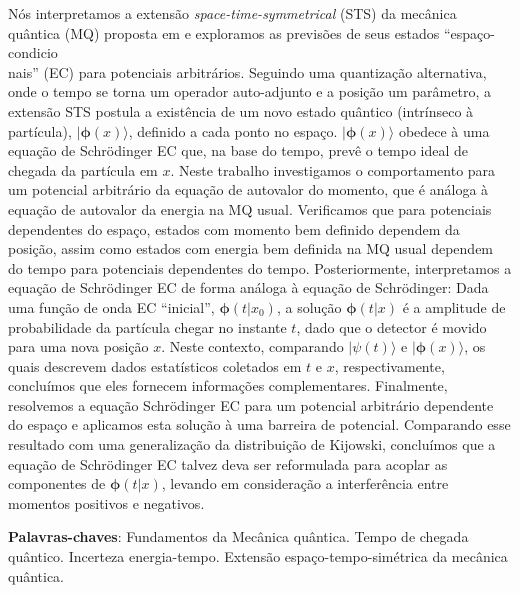 
\begin{resumo}[Resumo] 
Nós interpretamos a extensão \textit{space-time-symmetrical} (STS) da mecânica quântica (MQ) proposta em \cite{Dias} e exploramos as previsões de seus estados ``espaço-condicio\\nais'' (EC) para potenciais arbitrários. Seguindo uma quantização alternativa, onde o tempo se torna um operador auto-adjunto e a posição um parâmetro, a extensão STS postula a existência de um novo estado quântico (intrínseco à partícula), $|\pmb{\phi}(x)\rangle$, definido a cada ponto no espaço. $|\pmb{\phi}(x)\rangle$ obedece à uma equação de Schrödinger EC que, na base do tempo, prevê o tempo ideal de chegada da partícula em $x$. Neste trabalho investigamos o comportamento para um potencial arbitrário da equação de autovalor do momento, que é análoga à equação de autovalor da energia na MQ usual. Verificamos que para potenciais dependentes do espaço, estados com momento bem definido dependem da posição, assim como estados com energia bem definida na MQ usual dependem do tempo para potenciais dependentes do tempo. Posteriormente, interpretamos a equação de Schrödinger EC de forma análoga à equação de Schrödinger: Dada uma função de onda EC ``inicial'', $\pmb{\phi}(t|x_0)$, a solução $\pmb{\phi}(t|x)$ é a amplitude de probabilidade da partícula chegar no instante $t$, dado que o detector é movido para uma nova posição $x$. Neste contexto, comparando $|\psi(t) \rangle$ e $|\pmb{\phi}(x)\rangle$, os quais descrevem dados estatísticos coletados em $t$ e $x$, respectivamente, concluímos que eles fornecem informações complementares. Finalmente, resolvemos a equação Schrödinger EC para um potencial arbitrário dependente do espaço e aplicamos esta solução à uma barreira de potencial. Comparando esse resultado com uma generalização da distribuição de Kijowski, concluímos que a equação de Schrödinger EC talvez deva ser reformulada para acoplar as componentes de $\pmb{\phi}(t|x)$, levando em consideração a interferência entre momentos positivos e negativos.

 \vspace{\onelineskip}
    
 \noindent
 \textbf{Palavras-chaves}: Fundamentos da Mecânica quântica. Tempo de chegada quântico. Incerteza energia-tempo. Extensão espaço-tempo-simétrica da mecânica quântica.
\end{resumo}



